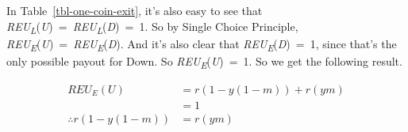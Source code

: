 \documentclass[
  12pt,
  letterpaper,
  DIV=11,
  numbers=noendperiod]{scrreprt}
\begin{document}
\begin{table}

\caption{\label{tbl-one-coin-exit}An exit game with exit payout 1.}

\begin{minipage}[t]{0.50\linewidth}



\end{minipage}%
%
\begin{minipage}[t]{0.50\linewidth}



\end{minipage}%

\end{table}%

In Table~\ref{tbl-one-coin-exit}, it's also easy to see that
\emph{REU\textsubscript{L}}(\emph{U})~=~\emph{REU\textsubscript{L}}(\emph{D})~=~1.
So by Single Choice Principle,
\emph{REU\textsubscript{E}}(\emph{U})~=~\emph{REU\textsubscript{E}}(\emph{D}).
And it's also clear that \emph{REU\textsubscript{E}}(\emph{D})~=~1,
since that's the only possible payout for Down. So
\emph{REU\textsubscript{E}}(\emph{U})~=~1. So we get the following
result.

\begin{align*}
REU_E(U) &= r(1-y(1-m)) + r(ym) \\
 &= 1    \\
\therefore  r(1-y(1-m)) &= r(ym)
\end{align*}
\end{document}
